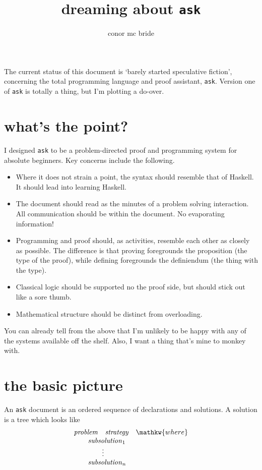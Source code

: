\documentclass{article}
\newcommand{\ask}{\texttt{ask}}
\newcommand{\where}{\mathkw{where}}
\begin{document}
\title{dreaming about \ask}
\author{conor mc bride}
\maketitle

The current status of this document is `barely started speculative fiction', concerning the total programming language and proof assistant, \ask. Version one of \ask{} is totally a thing, but I'm plotting a do-over.


\section{what's the point?}

I designed \ask{} to be a problem-directed proof and programming system for absolute beginners. Key concerns include the following.
\begin{itemize}
\item Where it does not strain a point, the syntax should resemble that of Haskell. It should lead into learning Haskell.
\item The document should read as the minutes of a problem solving interaction. All communication should be within the document. No evaporating information!
\item Programming and proof should, as activities, resemble each other as closely as possible. The difference is that proving foregrounds the proposition (the type of the proof), while defining foregrounds the definiendum (the thing with the type).
\item Classical logic should be supported no the proof side, but should stick out like a sore thumb.
\item Mathematical structure should be distinct from overloading.
\end{itemize}

You can already tell from the above that I'm unlikely to be happy with any of the systems available off the shelf. Also, I want a thing that's mine to monkey with.


\section{the basic picture}

An \ask{} document is an ordered sequence of declarations and solutions. A solution is a tree which looks like
\[\begin{array}{l}
\mathit{problem}\quad\mathit{strategy}\quad\where\\
\qquad\mathit{subsolution}_1\\
\qquad\qquad\vdots\\
\qquad\mathit{subsolution}_n\\
\end{array}\]
\end{document}
